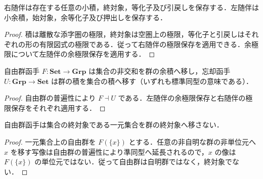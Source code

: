 \begin{prop}[積と等化子の保存]
右随伴は存在する任意の小積，終対象，等化子及び引戻しを保存する．左随伴は小余積，始対象，余等化子及び押出しを保存する．
\end{prop}
\begin{proof}
積は離散な添字圏の極限，終対象は空圏上の極限，等化子と引戻しはそれぞれの形の有限図式の極限である．従って右随伴の極限保存を適用できる．余極限について左随伴の余極限保存を適用する．
\end{proof}
\begin{prop}[自由群と非交和]
自由群函手 $F:\mathbf{Set}\to\mathbf{Grp}$ は集合の非交和を群の余積へ移し，忘却函手 $U:\mathbf{Grp}\to\mathbf{Set}$ は群の積を集合の積へ移す（いずれも標準同型の意味である）．
\end{prop}
\begin{proof}
自由群の普遍性により $F\dashv U$ である．左随伴の余極限保存と右随伴の極限保存をそれぞれ適用する．
\end{proof}
\begin{prop}[左随伴は終対象を保存するとは限らない]
自由群函手は集合の終対象である一元集合を群の終対象へ移さない．
\end{prop}
\begin{proof}
一元集合上の自由群を $F(\{x\})$ とする．任意の非自明な群の非単位元へ $x$ を移す写像は自由群の普遍性により準同型へ延長されるので，$x$ の像は $F(\{x\})$ の単位元ではない．従って自由群は自明群ではなく，終対象でない．
\end{proof}
